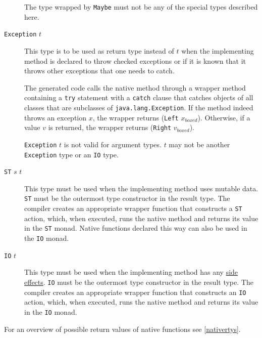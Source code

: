 \begin{description}
The type wrapped by \texttt{Maybe} must not be any of the special types described here.

\item[\texttt{Exception} $t$] This type is to be used as return type instead of $t$ when the implementing method is declared to throw checked exceptions or if it is known that it throws other exceptions that one needs to catch.

The generated code calls the native method through a wrapper method containing a \texttt{try} statement with a \texttt{catch} clause that catches objects of all classes that are subclasses of \texttt{java.lang.Exception}.
If the method indeed throws an exception $x$, the wrapper returns (\texttt{Left} $x_{boxed}$).
Otherwise, if a value $v$ is returned, the wrapper returns (\texttt{Right} $v_{boxed}$).

\texttt{Exception} $t$ is not valid for argument types. $t$ may not be another \texttt{Exception} type or an \texttt{IO} type.

\item[\texttt{ST} $s$ $t$] This type must be used when the implementing method uses mutable data. \texttt{ST} must be the outermost type constructor in the result type. The compiler creates an appropriate wrapper function that constructs a \texttt{ST}  action, which, when executed, runs the native method and returns its value in the \texttt{ST} monad. Native functions declared this way can also be used in the \texttt{IO} monad.

\item[\texttt{IO} $t$] This type must be used when the implementing method has any \hyperref[pure]{side effects}. \texttt{IO} must be the outermost type constructor in the result type. The compiler creates an appropriate wrapper function that constructs an \texttt{IO}  action, which, when executed, runs the native method and returns its value in the \texttt{IO} monad.

\end{description}

For an overview of possible return values of native functions see \autoref{nativertys}.

